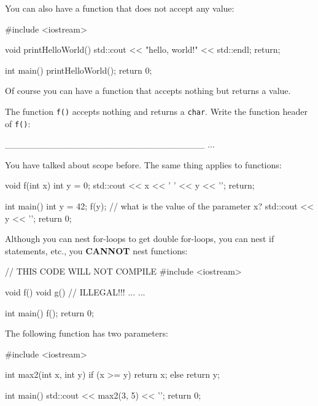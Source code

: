 You can also have a function that does not accept any value:

\begin{consolethree}[escapeinside=||]
#include <iostream>

void printHelloWorld()
{
    std::cout << "hello, world!" << std::endl;
    return;
}

int main()
{
    printHelloWorld();
    return 0;
}
\end{consolethree}

Of course you can have a function that accepts nothing but returns a value.

\begin{ex}
The function \texttt{f()} accepts nothing and returns a \texttt{char}. Write the function header of \texttt{f()}:

\begin{consolethree}[escapeinside=||]
_______________________________
{
    ...
}
\end{consolethree}
\end{ex}


\newpage{}

You have talked about scope before. The same thing applies to functions:

\begin{consolethree}[escapeinside=||]
void f(int x)
{
    int y = 0;
    std::cout << x << ' ' << y << '\n';
    return;
}

int main()
{
    int y = 42;
    f(y); // what is the value of the parameter x?
    std::cout << y << '\n';
    return 0;
}
\end{consolethree}

Although you can nest for-loops to get double for-loops, you can nest if
statements, etc., you \textbf{CANNOT} nest functions:

\begin{consolethree}[escapeinside=||]
// THIS CODE WILL NOT COMPILE
#include <iostream>

void f()
{
    void g() // ILLEGAL!!!
    {
        ...
    }
    ...
}

int main()
{
    f();
    return 0;
}
\end{consolethree}


\newpage{}

The following function has two parameters:

\begin{consolethree}[escapeinside=||]
#include <iostream>

int max2(int x, int y)
{
    if (x >= y)
    {
        return x;
    }
    else
    {
        return y;
    }
}

int main()
{
    std::cout << max2(3, 5) << '\n';
    return 0;
}
\end{consolethree}

